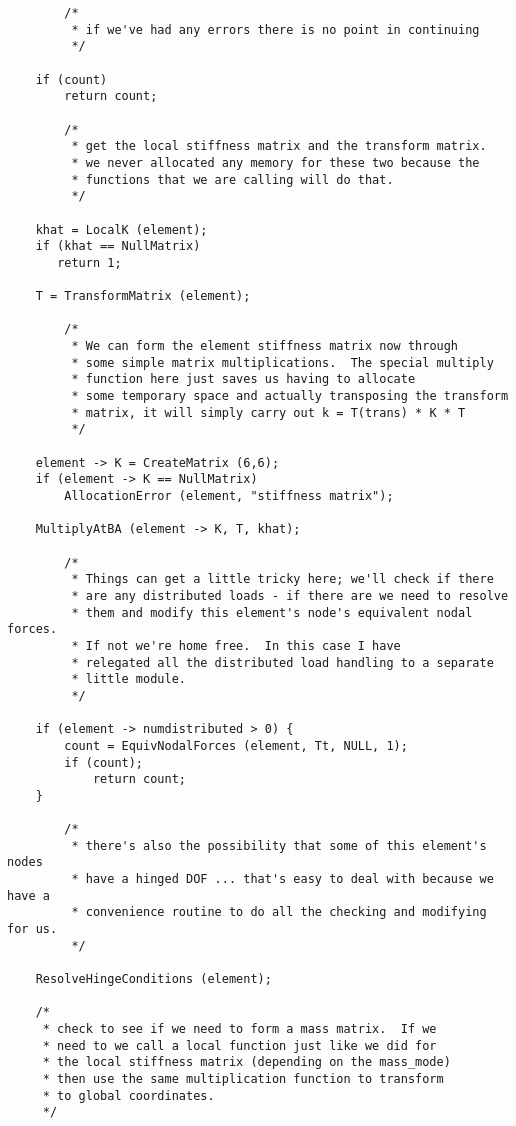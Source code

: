 {\begin{screen}
\begin{verbatim}
        /*
         * if we've had any errors there is no point in continuing
         */

    if (count)
        return count;

        /*
         * get the local stiffness matrix and the transform matrix.
         * we never allocated any memory for these two because the
         * functions that we are calling will do that.
         */

    khat = LocalK (element);
    if (khat == NullMatrix)
       return 1;
 
    T = TransformMatrix (element);

        /*
         * We can form the element stiffness matrix now through
         * some simple matrix multiplications.  The special multiply 
         * function here just saves us having to allocate
         * some temporary space and actually transposing the transform
         * matrix, it will simply carry out k = T(trans) * K * T
         */

    element -> K = CreateMatrix (6,6);
    if (element -> K == NullMatrix)
        AllocationError (element, "stiffness matrix");

    MultiplyAtBA (element -> K, T, khat);

        /*
         * Things can get a little tricky here; we'll check if there
         * are any distributed loads - if there are we need to resolve
         * them and modify this element's node's equivalent nodal forces.
         * If not we're home free.  In this case I have
         * relegated all the distributed load handling to a separate
         * little module.
         */

    if (element -> numdistributed > 0) {
        count = EquivNodalForces (element, Tt, NULL, 1);
        if (count);
            return count;
    }
        
        /* 
         * there's also the possibility that some of this element's nodes
         * have a hinged DOF ... that's easy to deal with because we have a
         * convenience routine to do all the checking and modifying for us.
         */

    ResolveHingeConditions (element);

	/*
	 * check to see if we need to form a mass matrix.  If we 
	 * need to we call a local function just like we did for
	 * the local stiffness matrix (depending on the mass_mode)
	 * then use the same multiplication function to transform
	 * to global coordinates.
	 */


\end{verbatim}
\end{screen}}
